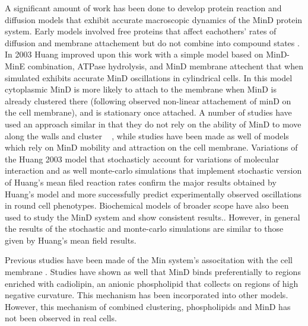 \documentclass[letterpaper,twocolumn,amsmath,amssymb,pre]{revtex4-1}
\begin{document}
A significant amount of work has been done to develop protein reaction
and diffusion models that exhibit accurate macroscopic dynamics of the
MinD protein system. Early models involved free proteins that affect
eachothers' rates of diffusion and membrane attachement but do not
combine into compound states\cite{meinhardt2001pattern} .  In 2003
Huang \cite{huang2003dynamic} improved upon this work with a simple
model based on MinD-MinE combination, ATPase hydrolysis, and MinD
membrane attechent that when simulated exhibits accurate MinD
oscillations in cylindrical cells\cite{huang2003dynamic}. In this
model cytoplasmic MinD is more likely to attach to the membrane when
MinD is already clustered there (following observed non-linear
attachement of minD on the cell membrane), and is stationary once
attached.  A number of studies have used an approach similar in that
they do not rely on the ability of MinD to move along the walls and
cluster ~\cite{kruse2007experimentalist} \cite{meinhardt2001pattern}
\cite{drew2005polymerization} \cite{fange2006noise}
\cite{kerr2006division}, while studies have been made as well of
models which rely on MinD mobility and attraction on the cell
membrane\cite{kruse2002dynamic}\cite{howard2005cellular}.  Variations
of the Huang 2003 model that stochasticly account for variations of
molecular interaction \cite{fange2006noise} and as well monte-carlo
simulations that implement stochastic version of Huang's mean filed
reaction rates confirm the major results obtained by Huang's model and
more successfully predict experimentally observed oscillations in
round cell phenotypes.\cite{drew2005polymerization}
\cite{fange2006noise} \cite{huang2004min} Biochemical models of
broader scope have also been used to study the MinD system and show
consistent results.\cite{arjunan2010new}.  However, in general the
results of the stochastic and monte-carlo simulations are similar to
those given by Huang's mean field results.

Previous studies have been made of the Min system's associtation with
the cell membrane
\cite{hsieh2010direct}\cite{mileykovskaya2003effects}.  Studies have
shown as well that MinD binds preferentially to regions enriched with
cadiolipin, an anionic phospholipid that collects on regions of high
negative curvature. This mechanism has been incorporated into other
models.\cite{drew2005polymerization,cytrynbaum2007multistranded,renner2012mind,renner2012mind}
However, this mechanism of combined clustering, phospholipids and MinD
has not been observed in real cells. \cite{halatek2012highly}
\end{document}
